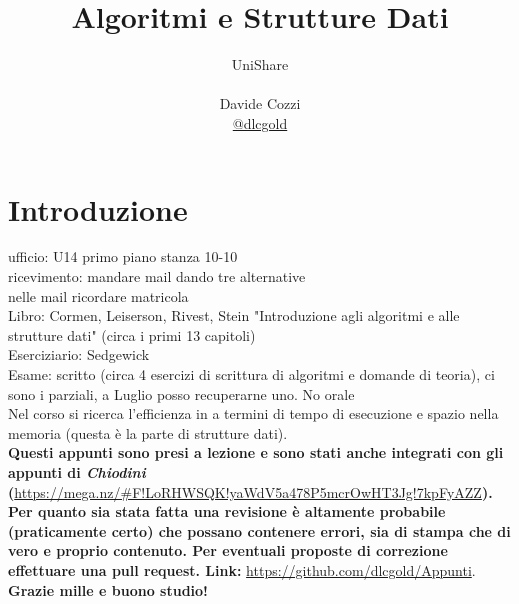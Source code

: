 \documentclass[a4paper,12pt,oneside,tikz]{book}
\title{Algoritmi e Strutture Dati}
\author{UniShare\\\\Davide Cozzi\\\href{https://t.me/dlcgold}{@dlcgold}\\}
\date{}
\begin{document}
\maketitle


\newtheorem{teorema}{Teorema}
\newtheorem{definizione}{Definizione}
\newtheorem{esempio}{Esempio}
\newtheorem{corollario}{Corollario}
\newtheorem{lemma}{Lemma}
\newtheorem{osservazione}{Osservazione}
\newtheorem{nota}{Nota}
\newtheorem{esercizio}{Esercizio}
\tableofcontents
\renewcommand{\chaptermark}[1]{%
\markboth{\chaptername
\ \thechapter.\ #1}{}}
\renewcommand{\sectionmark}[1]{\markright{\thesection.\ #1}}


\chapter{Introduzione}

ufficio: U14 primo piano stanza 10-10\\
ricevimento: mandare mail dando tre alternative\\
nelle mail ricordare matricola\\
Libro: Cormen, Leiserson, Rivest, Stein "Introduzione agli algoritmi e alle strutture dati" (circa i primi 13 capitoli)\\
Eserciziario: Sedgewick\\
Esame: scritto (circa 4 esercizi di scrittura di algoritmi e domande di teoria), ci sono i parziali, a Luglio posso recuperarne uno. No orale \\
Nel corso si ricerca l'efficienza in a termini di tempo di esecuzione e spazio nella memoria (questa è la parte di strutture dati).\\
\textbf{Questi appunti sono presi a lezione e sono stati anche integrati con gli appunti di \textit{Chiodini} (}\url{https://mega.nz/#F!LoRHWSQK!yaWdV5a478P5mcrOwHT3Jg!7kpFyAZZ}\textbf{). Per quanto sia stata fatta una revisione è altamente probabile (praticamente certo) che possano contenere errori, sia di stampa che di vero e proprio contenuto. Per eventuali proposte di correzione effettuare una pull request. Link: } \url{https://github.com/dlcgold/Appunti}.\\
\textbf{Grazie mille e buono studio!}
\end{document}
